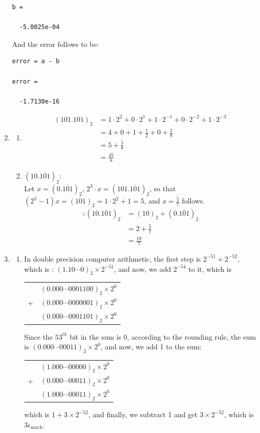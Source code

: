 \documentclass{article}
\begin{document}
\begin{enumerate}
\begin{lstlisting}
b =

  -5.0025e-04
\end{lstlisting}
And the error follows to be:\begin{lstlisting}
error = a - b

error =

  -1.7130e-16
\end{lstlisting}
\item \begin{enumerate}
\item
\begin{align*}
(101.101)_2&= 1\cdot 2^2+0\cdot 2^1+1\cdot 2^{-1} + 0 \cdot 2^{-2}+1\cdot 2^{-3}\\
&=4+0+1+\frac{1}{2}+0+\frac{1}{8}\\
&=5+\frac{5}{8}\\
&=\boxed{\frac{45}{8}}
\end{align*}
\item
$(10.\overline{101})_2:$\\

Let $x =(0.\overline{101})_2 $, $2^3 \cdot x = (101.\overline{101})_2$, so that $(2^3 -1) x = (101)_2= 1\cdot 2^2 +1 =5$, and $x= \frac{5}{7}$ follows.
\begin{align*}
\therefore (10.\overline{101})_2&=(10)_2 + (0.\overline{101})_2\\
&=2+\frac{5}{7}\\
&=\boxed{\frac{19}{7}}
\end{align*}
\end{enumerate}
\item
\begin{enumerate}
\item
In double precision computer arithmetic, the first step is $2^{-51} + 2^{-52}$, which is : $(1.\boxed{10\cdots 0})_2\times 2^{-51}$, and now, we add $2^{-54}$ to it, which is 
\begin{center}
\begin{tabular}{lr}
& $(0.\boxed{000 \cdots 00011}00)_2 \times 2^0$\\
+ &$(0.\boxed{000 \cdots 00000}01)_2 \times 2^0$\\
\hline
& $(0.\boxed{000 \cdots 00011}01)_2 \times 2^0$\\
\end{tabular}
\end{center}
Since the $53^{th}$ bit in the sum is 0, according to the rounding rule, the sum is $(0.\boxed{000 \cdots 00011})_2 \times 2^0$, and now, we add 1 to the sum:
\begin{center}
\begin{tabular}{lr}
& $(1.\boxed{000 \cdots 00000})_2 \times 2^0$\\
+ &$(0.\boxed{000 \cdots 00011})_2 \times 2^0$\\
\hline
& $(1.\boxed{000 \cdots 00011})_2 \times 2^0$\\
\end{tabular}
\end{center}
which is $1+3\times 2^{-52}$, and finally, we subtract 1 and get $3\times 2^{-52}$, which is $3\epsilon_{\text{mach}}$.


\end{enumerate}
\end{enumerate}
\end{document}
